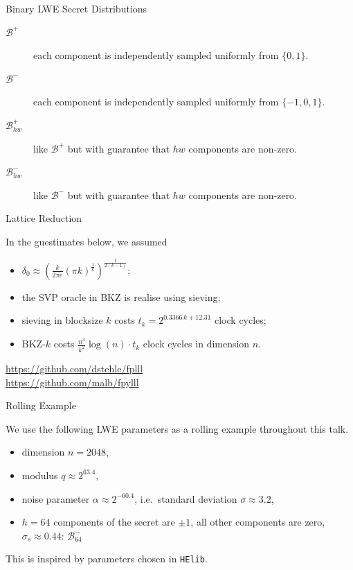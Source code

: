 \documentclass[10pt,compress]{beamer}
\renewcommand{\B}[2][]{\ensuremath{\mathcal{B}_{#1}^{#2}}\xspace}
\begin{document}
\begin{frame}{Binary LWE Secret Distributions}
  \begin{block}{}
    \begin{description}
    \item[$\B{+}$] each component is independently sampled uniformly from \(\{0,1\}\).
    \item[$\B{-}$] each component is independently sampled uniformly from \(\{-1,0,1\}\).  
    \item[$\mathcal{B}^{+}_{hw}$] like $\B{+}$ but with guarantee that  \(hw\) components are non-zero. 
    \item[$\mathcal{B}^{-}_{hw}$] like $\B{-}$ but with guarantee that  \(hw\) components are non-zero. 
    \end{description}
  \end{block}
\end{frame}


\begin{frame}{Lattice Reduction}

  In the guestimates below, we assumed
  \begin{itemize}
  \item $\delta_0 \approx {\left( \frac{k}{2 \pi e} {(\pi k)}^{\frac{1}{k}}  \right)}^{\frac{1}{2(k-1)}}$;
  \item the SVP oracle in BKZ is realise using sieving;
  \item sieving in blocksize $k$ costs $t_k = 2^{0.3366\,k + 12.31}$ clock cycles;
  \item BKZ-$k$ costs $\frac{n^3}{k^2} \log(n) \cdot t_k$ clock cycles in dimension $n$.
  \end{itemize}

  \begin{center}
    \url{https://github.com/dstehle/fplll}\\
     \url{https://github.com/malb/fpylll}   
  \end{center}

\end{frame}


\begin{frame}{Rolling Example}

We use the following LWE parameters as a rolling example throughout this talk.

  \begin{itemize}
  \item dimension $n=2048$,
  \item modulus $q ≈ 2^{63.4}$,
  \item noise parameter $\alpha ≈ 2^{-60.4}$, i.e.\ standard deviation $σ ≈ 3.2$,
  \item $h=64$ components of the secret are $\pm 1$, all other components are zero, $σ_s ≈ 0.44$: $\B[64]{-}$
  \end{itemize}

This is inspired by parameters chosen in {\tt HElib}.
  
\end{frame}
\end{document}
